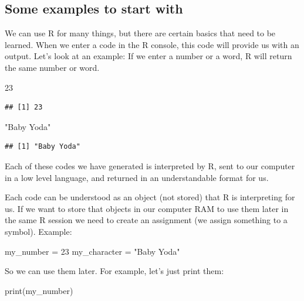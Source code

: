 \documentclass[
]{book}
\newenvironment{Shaded}{\begin{snugshade}}{\end{snugshade}}
\newcommand{\DecValTok}[1]{\textcolor[rgb]{0.00,0.00,0.81}{#1}}
\newcommand{\FunctionTok}[1]{\textcolor[rgb]{0.00,0.00,0.00}{#1}}
\newcommand{\NormalTok}[1]{#1}
\newcommand{\OtherTok}[1]{\textcolor[rgb]{0.56,0.35,0.01}{#1}}
\newcommand{\StringTok}[1]{\textcolor[rgb]{0.31,0.60,0.02}{#1}}
\begin{document}
\hypertarget{some-examples-to-start-with}{%
\subsection{Some examples to start with}\label{some-examples-to-start-with}}

We can use R for many things, but there are certain basics that need to be learned. When we enter a code in the R console, this code will provide us with an output. Let's look at an example: If we enter a number or a word, R will return the same number or word.

\begin{Shaded}
\begin{Highlighting}[]
\DecValTok{23}
\end{Highlighting}
\end{Shaded}

\begin{verbatim}
## [1] 23
\end{verbatim}

\begin{Shaded}
\begin{Highlighting}[]
\StringTok{"Baby Yoda"}
\end{Highlighting}
\end{Shaded}

\begin{verbatim}
## [1] "Baby Yoda"
\end{verbatim}

Each of these codes we have generated is interpreted by R, sent to our computer in a low level language, and returned in an understandable format for us.

Each code can be understood as an object (not stored) that R is interpreting for us. If we want to store that objects in our computer RAM to use them later in the same R session we need to create an assignment (we assign something to a symbol). Example:

\begin{Shaded}
\begin{Highlighting}[]
\NormalTok{my\_number }\OtherTok{=} \DecValTok{23}
\NormalTok{my\_character }\OtherTok{=} \StringTok{"Baby Yoda"}
\end{Highlighting}
\end{Shaded}

So we can use them later. For example, let's just print them:

\begin{Shaded}
\begin{Highlighting}[]
\FunctionTok{print}\NormalTok{(my\_number)}
\end{Highlighting}
\end{Shaded}
\end{document}
